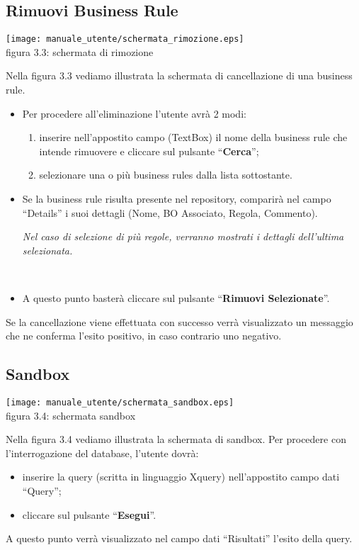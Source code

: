 \subsection{Rimuovi Business Rule}
\begin{center}
\texttt{[image: manuale\_utente/schermata\_rimozione.eps]}\\
 figura 3.3: schermata di rimozione
\end{center}
Nella figura 3.3 vediamo illustrata la schermata di cancellazione di una business rule. 
\begin{itemize}
\item Per procedere all'eliminazione l'utente avr\`a 2 modi:
\begin{enumerate}
\item inserire nell'appostito campo (TextBox) il nome della business rule che intende rimuovere e cliccare sul pulsante ``\textbf{Cerca}'';
\item selezionare una o pi\`u business rules dalla lista sottostante.
\end{enumerate}
\item Se la business rule risulta presente nel repository, comparir\`a  nel campo ``Details'' i suoi dettagli (Nome, BO Associato, Regola, Commento). \\
\begin{footnotesize}\textit{Nel caso di selezione di pi\`u regole, verranno mostrati i dettagli dell'ultima selezionata.
} \end{footnotesize} \\
\item A questo punto baster\`a cliccare sul pulsante ``\textbf{Rimuovi Selezionate}''.  
\end{itemize}
Se la cancellazione viene effettuata con successo verr\`a visualizzato un messaggio che ne conferma l'esito positivo, in caso contrario uno negativo.
\subsection{Sandbox}
\begin{center}
 \texttt{[image: manuale\_utente/schermata\_sandbox.eps]} \\
 figura 3.4: schermata sandbox
\end{center}
Nella figura 3.4 vediamo illustrata la schermata di sandbox. Per procedere con l'interrogazione del database, l'utente dovr\`a:
\begin{itemize}
\item inserire la query (scritta in linguaggio Xquery) nell'appostito campo dati ``Query'';
\item cliccare sul pulsante ``\textbf{Esegui}''.
\end{itemize}
A questo punto verr\`a visualizzato nel campo dati ``Risultati'' l'esito della query.
